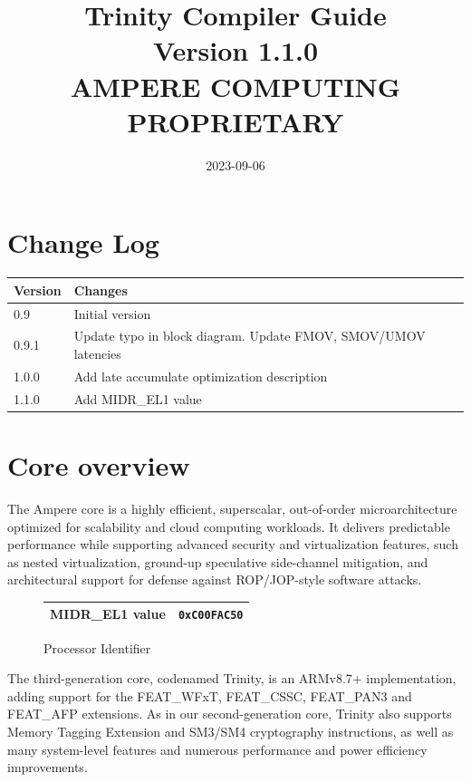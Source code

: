 \documentclass{article}
\title{Trinity Compiler Guide \\ Version 1.1.0\\ AMPERE COMPUTING PROPRIETARY}
\date{2023-09-06}
\begin{document}
\maketitle
\section{Change Log}
\begin{longtable}{|l|p{4in}|}
  \hline
  {\bf Version} & {\bf Changes} \\ \hline
  \hline
  \endfirsthead
  0.9 & Initial version \\ \hline
  0.9.1 & Update typo in block diagram. Update FMOV, SMOV/UMOV latencies \\ \hline
  1.0.0 & Add late accumulate optimization description \\ \hline
  1.1.0 & Add MIDR\_EL1 value \\ \hline
\end{longtable}

\section{Core overview}

The Ampere core is a highly efficient, superscalar, out-of-order
microarchitecture optimized for scalability and cloud computing
workloads. It delivers predictable performance while supporting
advanced security and virtualization features, such as nested
virtualization, ground-up speculative side-channel mitigation, and
architectural support for defense against ROP/JOP-style software
attacks. \\


\begin{figure}
\caption{Processor Identifier}
\begin{center}
  \begin{tabular}{|l|l|} \hline
    MIDR\_EL1 value &  {\tt 0xC00FAC50} \\ \hline
    \end{tabular}
\end{center}
\end{figure}
The third-generation core, codenamed Trinity, is an ARMv8.7+
implementation, adding support for the FEAT\_WFxT, FEAT\_CSSC, FEAT\_PAN3
and FEAT\_AFP extensions.  As in our second-generation core, Trinity
also supports Memory Tagging Extension and SM3/SM4 cryptography
instructions, as well as many system-level features and numerous
performance and power efficiency improvements. \\
\end{document}
